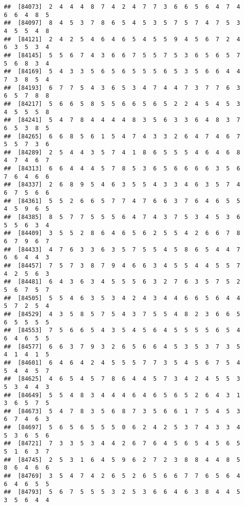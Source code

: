\documentclass[
]{book}
\begin{document}
\begin{verbatim}
##  [84073]  2  4  4  4  8  7  4  2  4  7  7  3  6  6  5  6  4  7  4  6  6  4  8  5
##  [84097]  8  4  5  3  7  8  6  5  4  5  3  5  7  5  7  4  7  5  3  4  5  5  4  8
##  [84121]  2  4  2  5  4  6  4  6  5  4  5  5  9  4  5  6  7  2  4  6  3  5  3  4
##  [84145]  5  5  6  7  4  3  6  6  7  5  5  7  5  3  6  5  6  5  7  5  6  8  3  4
##  [84169]  5  4  3  3  5  6  5  6  5  5  5  6  5  3  5  6  6  4  4  7  3  8  5  4
##  [84193]  6  7  7  5  4  3  6  5  3  4  7  4  4  7  3  7  7  6  3  6  5  7  8  8
##  [84217]  5  6  6  5  8  5  5  6  6  5  6  5  2  2  4  5  4  5  3  4  5  5  5  8
##  [84241]  5  4  7  8  4  4  4  4  8  3  5  6  3  3  6  4  8  3  7  6  5  3  8  5
##  [84265]  6  6  8  5  6  1  5  4  7  4  3  3  2  6  4  7  4  6  7  5  5  7  3  6
##  [84289]  2  5  4  4  3  5  7  4  1  8  6  5  5  5  4  6  4  6  8  4  7  4  6  7
##  [84313]  6  6  4  4  4  5  7  8  5  3  6  5  6  6  6  6  3  5  6  7  6  4  6  6
##  [84337]  2  6  8  9  5  4  6  3  5  5  4  3  3  4  6  3  5  7  4  6  7  5  6  6
##  [84361]  5  5  2  6  6  5  7  7  4  7  6  6  3  7  6  4  6  5  5  4  5  9  6  5
##  [84385]  8  5  7  7  5  5  5  6  4  7  4  3  7  5  3  4  5  3  6  5  5  6  3  4
##  [84409]  3  5  5  2  8  6  4  6  5  6  2  5  5  4  2  6  6  7  8  6  7  9  6  7
##  [84433]  4  7  6  3  3  6  3  5  7  5  5  4  5  8  6  5  4  4  7  6  6  4  4  3
##  [84457]  7  5  7  3  8  7  9  4  6  6  3  4  5  5  4  4  5  5  7  4  2  5  6  3
##  [84481]  6  4  3  6  3  4  5  5  5  6  3  2  7  6  3  5  7  5  2  5  6  7  5  7
##  [84505]  5  5  4  6  3  5  3  4  2  4  3  4  4  6  6  5  6  4  4  5  7  2  5  4
##  [84529]  4  3  5  8  5  7  5  4  3  7  5  5  4  8  2  3  6  6  5  6  5  5  5  5
##  [84553]  7  5  6  6  5  4  3  5  4  5  6  4  5  5  5  5  6  5  4  6  4  6  5  5
##  [84577]  6  6  3  7  9  3  2  6  5  6  6  4  5  3  5  3  7  3  5  4  1  4  1  5
##  [84601]  6  4  6  4  2  4  5  5  5  7  7  3  5  4  5  6  7  5  4  5  4  4  5  7
##  [84625]  4  6  5  4  5  7  8  6  4  4  5  7  3  4  2  4  5  5  3  5  3  4  4  3
##  [84649]  5  5  4  8  3  4  4  4  6  4  6  5  6  5  2  6  4  3  1  3  6  5  7  5
##  [84673]  5  4  7  8  3  5  6  8  7  3  5  6  6  1  7  5  4  5  3  6  7  4  6  3
##  [84697]  5  6  5  6  5  5  5  0  6  2  4  2  5  3  7  4  3  3  4  5  3  6  5  6
##  [84721]  7  3  3  5  3  4  4  2  6  7  6  4  5  6  5  4  5  6  5  5  1  6  3  7
##  [84745]  2  5  3  1  6  4  5  9  6  2  7  2  3  8  8  4  4  8  5  8  6  4  6  6
##  [84769]  3  5  4  7  4  2  6  5  2  6  5  6  6  7  7  6  5  6  4  6  4  6  5  5
##  [84793]  5  6  7  5  5  5  3  2  5  3  6  6  4  6  3  8  4  4  5  3  5  6  4  4

\end{verbatim}
\end{document}
